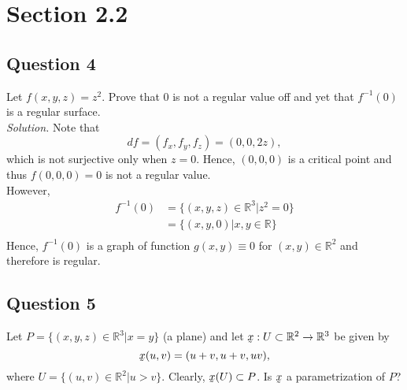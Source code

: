 \documentclass[12pt]{article}
\begin{document}
\section{Section 2.2}

\subsection*{Question 4}
Let $f(x, y, z) = z^2$. Prove that $0$ is not a regular value off and yet that $f^{-1}(0)$ is a regular surface.\\

\textit{Solution.} Note that \begin{equation*}
    df = (f_x,f_y,f_z) = (0,0,2z),
\end{equation*}
which is not surjective only when $z=0$. Hence, $(0,0,0)$ is a critical point and thus $f(0,0,0)=0$ is not a regular value.\\

However, \begin{align*}
    f^{-1}(0) &= \{(x,y,z)\in \mathbb{R}^3|z^2 = 0\}\\
    &= \{(x,y,0)|x,y \in \mathbb{R}\} \\
\end{align*}
Hence, $f^{-1}(0)$ is a graph of function $g(x,y)\equiv 0$ for $(x,y) \in \mathbb{R}^2$ and therefore is regular.

\subsection*{Question 5}
Let $P= \{(x,y,z)\in \mathbb{R}^3|x= y\}$ (a plane) and let $\underaccent{\tilde}{x}:U \subset \mathbb{R}^2 \to \mathbb{R}^3$ be given by \begin{equation*}
    \underaccent{\tilde}{x}(u,v) = (u+v,u+v,uv),
\end{equation*}
 where $U=\{(u,v)\in \mathbb{R}^2|u>v\}$. Clearly, $\underaccent{\tilde}{x}(U)\subset P$. Is $\underaccent{\tilde}{x}$ a parametrization of $P$?\\
 
\end{document}
